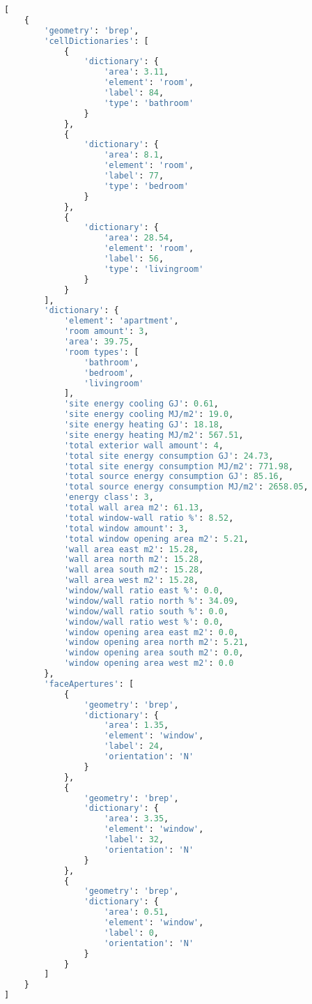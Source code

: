 \documentclass[a4paper, 12pt]{report}
\begin{document}
\begin{lstlisting}[language=python,caption={JSON File Structure},captionpos=b,label={lst:json-file-structure},showstringspaces=false]
[
    {
        'geometry': 'brep',
        'cellDictionaries': [
            {
                'dictionary': {
                    'area': 3.11,
                    'element': 'room',
                    'label': 84,
                    'type': 'bathroom'
                }
            },
            {
                'dictionary': {
                    'area': 8.1,
                    'element': 'room',
                    'label': 77,
                    'type': 'bedroom'
                }
            },
            {
                'dictionary': {
                    'area': 28.54,
                    'element': 'room',
                    'label': 56,
                    'type': 'livingroom'
                }
            }
        ],
        'dictionary': {
            'element': 'apartment',
            'room amount': 3,
            'area': 39.75,
            'room types': [
                'bathroom',
                'bedroom',
                'livingroom'
            ],
            'site energy cooling GJ': 0.61,
            'site energy cooling MJ/m2': 19.0,
            'site energy heating GJ': 18.18,
            'site energy heating MJ/m2': 567.51,
            'total exterior wall amount': 4,
            'total site energy consumption GJ': 24.73,
            'total site energy consumption MJ/m2': 771.98,
            'total source energy consumption GJ': 85.16,
            'total source energy consumption MJ/m2': 2658.05,
            'energy class': 3,
            'total wall area m2': 61.13,
            'total window-wall ratio %': 8.52,
            'total window amount': 3,
            'total window opening area m2': 5.21,
            'wall area east m2': 15.28,
            'wall area north m2': 15.28,
            'wall area south m2': 15.28,
            'wall area west m2': 15.28,
            'window/wall ratio east %': 0.0,
            'window/wall ratio north %': 34.09,
            'window/wall ratio south %': 0.0,
            'window/wall ratio west %': 0.0,
            'window opening area east m2': 0.0,
            'window opening area north m2': 5.21,
            'window opening area south m2': 0.0,
            'window opening area west m2': 0.0
        },
        'faceApertures': [
            {
                'geometry': 'brep',
                'dictionary': {
                    'area': 1.35,
                    'element': 'window',
                    'label': 24,
                    'orientation': 'N'
                }
            },
            {
                'geometry': 'brep',
                'dictionary': {
                    'area': 3.35,
                    'element': 'window',
                    'label': 32,
                    'orientation': 'N'
                }
            },
            {
                'geometry': 'brep',
                'dictionary': {
                    'area': 0.51,
                    'element': 'window',
                    'label': 0,
                    'orientation': 'N'
                }
            }
        ]
    }
]
\end{lstlisting}
\end{document}
